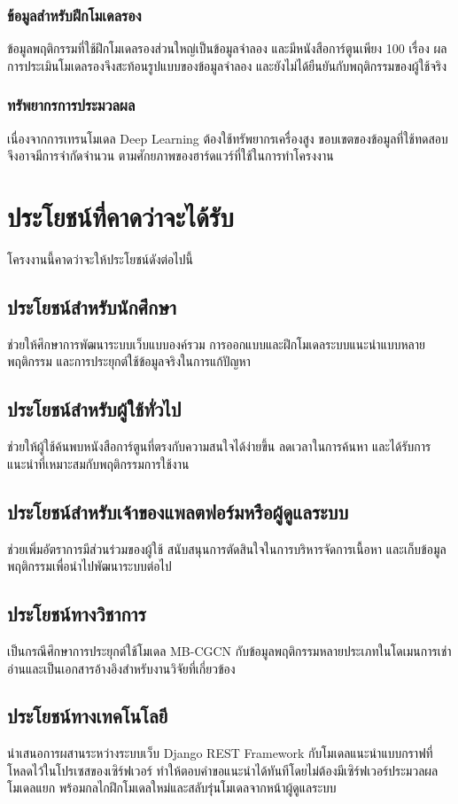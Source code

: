 \subsubsection{ข้อมูลสำหรับฝึกโมเดลรอง}
ข้อมูลพฤติกรรมที่ใช้ฝึกโมเดลรองส่วนใหญ่เป็นข้อมูลจำลอง และมีหนังสือการ์ตูนเพียง 100 เรื่อง ผลการประเมินโมเดลรองจึงสะท้อนรูปแบบของข้อมูลจำลอง และยังไม่ได้ยืนยันกับพฤติกรรมของผู้ใช้จริง

\subsubsection{ทรัพยากรการประมวลผล}
เนื่องจากการเทรนโมเดล Deep Learning ต้องใช้ทรัพยากรเครื่องสูง ขอบเขตของข้อมูลที่ใช้ทดสอบจึงอาจมีการจำกัดจำนวน ตามศักยภาพของฮาร์ดแวร์ที่ใช้ในการทำโครงงาน

\section{ประโยชน์ที่คาดว่าจะได้รับ}
โครงงานนี้คาดว่าจะให้ประโยชน์ดังต่อไปนี้

\subsection{ประโยชน์สำหรับนักศึกษา}
ช่วยให้ศึกษาการพัฒนาระบบเว็บแบบองค์รวม การออกแบบและฝึกโมเดลระบบแนะนำแบบหลายพฤติกรรม และการประยุกต์ใช้ข้อมูลจริงในการแก้ปัญหา

\subsection{ประโยชน์สำหรับผู้ใช้ทั่วไป}
ช่วยให้ผู้ใช้ค้นพบหนังสือการ์ตูนที่ตรงกับความสนใจได้ง่ายขึ้น ลดเวลาในการค้นหา และได้รับการแนะนำที่เหมาะสมกับพฤติกรรมการใช้งาน

\subsection{ประโยชน์สำหรับเจ้าของแพลตฟอร์มหรือผู้ดูแลระบบ}
ช่วยเพิ่มอัตราการมีส่วนร่วมของผู้ใช้ สนับสนุนการตัดสินใจในการบริหารจัดการเนื้อหา และเก็บข้อมูลพฤติกรรมเพื่อนำไปพัฒนาระบบต่อไป

\subsection{ประโยชน์ทางวิชาการ}
เป็นกรณีศึกษาการประยุกต์ใช้โมเดล MB-CGCN กับข้อมูลพฤติกรรมหลายประเภทในโดเมนการเช่าอ่านและเป็นเอกสารอ้างอิงสำหรับงานวิจัยที่เกี่ยวข้อง

\subsection{ประโยชน์ทางเทคโนโลยี}
นำเสนอการผสานระหว่างระบบเว็บ Django REST Framework กับโมเดลแนะนำแบบกราฟที่โหลดไว้ในโปรเซสของเซิร์ฟเวอร์ ทำให้ตอบคำขอแนะนำได้ทันทีโดยไม่ต้องมีเซิร์ฟเวอร์ประมวลผลโมเดลแยก พร้อมกลไกฝึกโมเดลใหม่และสลับรุ่นโมเดลจากหน้าผู้ดูแลระบบ
